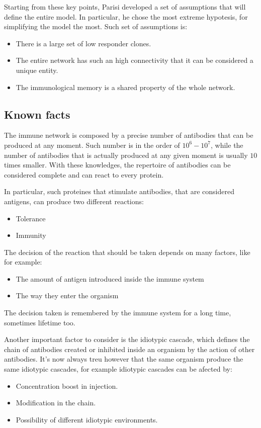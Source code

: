 Starting from these key points, Parisi developed a set of assumptions that will define the entire model. In particular, he chose the most extreme hypotesis, for simplifying the model the most. Such set of assumptions is:
\begin{itemize}
    \item There is a large set of low responder clones.
    \item The entire network has such an high connectivity that it can be considered a unique entity.
    \item The immunological memory is a shared property of the whole network.
\end{itemize}

\subsection{Known facts}

The immune network is composed by a precise number of antibodies that can be produced at any moment. Such number is in the order of $10^6 - 10^7$, while the number of antibodies that is actually produced at any given moment is usually $10$ times smaller. With these knowledges, the repertoire of antibodies can be considered complete and can react to every protein.

In particular, such proteines that stimulate antibodies, that are considered antigens, can produce two different reactions:
\begin{itemize}
    \item Tolerance
    \item Immunity
\end{itemize}
The decision of the reaction that should be taken depends on many factors, like for example:
\begin{itemize}
    \item The amount of antigen introduced inside the immune system
    \item The way they enter the organism
\end{itemize}
The decision taken is remembered by the immune system for a long time, sometimes lifetime too. 

Another important factor to consider is the idiotypic cascade, which defines the chain of antibodies created or inhibited inside an organism by the action of other antibodies. It's now always treu however that the same organism produce the same idiotypic cascades, for example idiotypic cascades can be afected by:
\begin{itemize}
    \item Concentration boost in injection.
    \item Modification in the chain.
    \item Possibility of different idiotypic environments.
\end{itemize}

